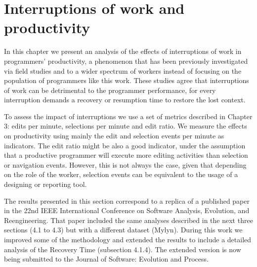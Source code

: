 



\chapter{Interruptions of work and productivity}
In this chapter we present an analysis of the effects of interruptions of work in programmers' productivity, a phenomenon that has been previously investigated via field studies and to a wider spectrum of workers \cite{GM04, MGK08, CHW04, ABV12} instead of focusing on the population of programmers like this work. These studies agree that interruptions of work can be detrimental to the programmer performance, for every interruption demands a recovery or resumption time to restore the lost context.

To assess the impact of interruptions we use a set of metrics described in Chapter 3: edits per minute, selections per minute and edit ratio. We measure the effects on productivity using mainly the edit and selection events per minute as indicators. The edit ratio \cite{KM06} might be also a good indicator, under the assumption that a productive programmer will execute more editing activities than selection or navigation events. However, this is not always the case, given that depending on the role of the worker, selection events can be equivalent to the usage of a designing or reporting tool.

The results presented in this section correspond to a replica of a published paper \cite{SRV15} in the 22nd IEEE International Conference on Software Analysis, Evolution, and Reengineering. That paper included the same analyses described in the next three sections (4.1 to 4.3) but with a different dataset (Mylyn). During this work we improved some of the methodology and extended the results to include a detailed analysis of the Recovery Time (subsection 4.1.4). The extended version is now being submitted to the Journal of Software: Evolution and Process.

